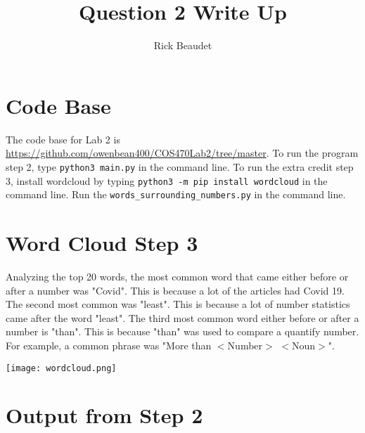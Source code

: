 \documentclass{article}
\title{Question 2 Write Up}
\author{Rick Beaudet}
\begin{document}
\maketitle

\section{Code Base}

The code base for Lab 2 is \href{https://github.com/owenbean400/COS470Lab2/tree/master}{https://github.com/owenbean400/COS470Lab2/tree/master}. To run the program step 2, type \verb|python3 main.py| in the command line. To run the extra credit step 3, install wordcloud by typing \verb|python3 -m pip install wordcloud| in the command line. Run the \verb|words_surrounding_numbers.py| in the command line.

\section{Word Cloud Step 3}

Analyzing the top 20 words, the most common word that came either before or after a number was "Covid". This is because a lot of the articles had Covid 19. The second most common was "least". This is because a lot of number statistics came after the word "least". The third most common word either before or after a number is "than". This is because "than" was used to compare a quantify number. For example, a common phrase was "More than $<$Number$>$  $<$Noun$>$".

\texttt{[image: wordcloud.png]}

\section{Output from Step 2}


\end{document}
